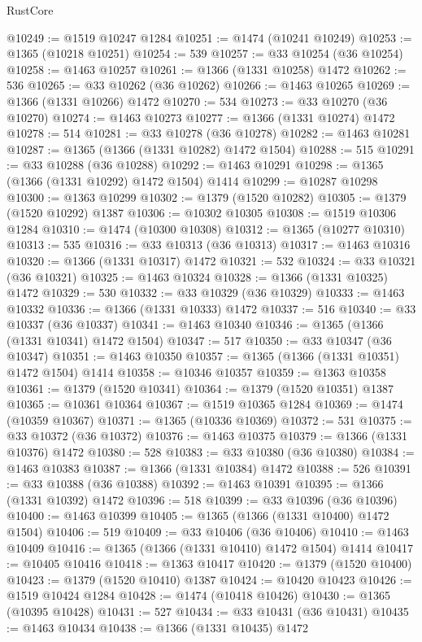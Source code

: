 \begin{lexlean}{RustCore}
\begin{coremodule}
@10249 := @1519 @10247 @1284
@10251 := @1474 (@10241 @10249)
@10253 := @1365 (@10218 @10251)
@10254 := 539
@10257 := @33 @10254 (@36 @10254)
@10258 := @1463 @10257
@10261 := @1366 (@1331 @10258) @1472
@10262 := 536
@10265 := @33 @10262 (@36 @10262)
@10266 := @1463 @10265
@10269 := @1366 (@1331 @10266) @1472
@10270 := 534
@10273 := @33 @10270 (@36 @10270)
@10274 := @1463 @10273
@10277 := @1366 (@1331 @10274) @1472
@10278 := 514
@10281 := @33 @10278 (@36 @10278)
@10282 := @1463 @10281
@10287 := @1365 (@1366 (@1331 @10282) @1472 @1504)
@10288 := 515
@10291 := @33 @10288 (@36 @10288)
@10292 := @1463 @10291
@10298 := @1365 (@1366 (@1331 @10292) @1472 @1504) @1414
@10299 := @10287 @10298
@10300 := @1363 @10299
@10302 := @1379 (@1520 @10282)
@10305 := @1379 (@1520 @10292) @1387
@10306 := @10302 @10305
@10308 := @1519 @10306 @1284
@10310 := @1474 (@10300 @10308)
@10312 := @1365 (@10277 @10310)
@10313 := 535
@10316 := @33 @10313 (@36 @10313)
@10317 := @1463 @10316
@10320 := @1366 (@1331 @10317) @1472
@10321 := 532
@10324 := @33 @10321 (@36 @10321)
@10325 := @1463 @10324
@10328 := @1366 (@1331 @10325) @1472
@10329 := 530
@10332 := @33 @10329 (@36 @10329)
@10333 := @1463 @10332
@10336 := @1366 (@1331 @10333) @1472
@10337 := 516
@10340 := @33 @10337 (@36 @10337)
@10341 := @1463 @10340
@10346 := @1365 (@1366 (@1331 @10341) @1472 @1504)
@10347 := 517
@10350 := @33 @10347 (@36 @10347)
@10351 := @1463 @10350
@10357 := @1365 (@1366 (@1331 @10351) @1472 @1504) @1414
@10358 := @10346 @10357
@10359 := @1363 @10358
@10361 := @1379 (@1520 @10341)
@10364 := @1379 (@1520 @10351) @1387
@10365 := @10361 @10364
@10367 := @1519 @10365 @1284
@10369 := @1474 (@10359 @10367)
@10371 := @1365 (@10336 @10369)
@10372 := 531
@10375 := @33 @10372 (@36 @10372)
@10376 := @1463 @10375
@10379 := @1366 (@1331 @10376) @1472
@10380 := 528
@10383 := @33 @10380 (@36 @10380)
@10384 := @1463 @10383
@10387 := @1366 (@1331 @10384) @1472
@10388 := 526
@10391 := @33 @10388 (@36 @10388)
@10392 := @1463 @10391
@10395 := @1366 (@1331 @10392) @1472
@10396 := 518
@10399 := @33 @10396 (@36 @10396)
@10400 := @1463 @10399
@10405 := @1365 (@1366 (@1331 @10400) @1472 @1504)
@10406 := 519
@10409 := @33 @10406 (@36 @10406)
@10410 := @1463 @10409
@10416 := @1365 (@1366 (@1331 @10410) @1472 @1504) @1414
@10417 := @10405 @10416
@10418 := @1363 @10417
@10420 := @1379 (@1520 @10400)
@10423 := @1379 (@1520 @10410) @1387
@10424 := @10420 @10423
@10426 := @1519 @10424 @1284
@10428 := @1474 (@10418 @10426)
@10430 := @1365 (@10395 @10428)
@10431 := 527
@10434 := @33 @10431 (@36 @10431)
@10435 := @1463 @10434
@10438 := @1366 (@1331 @10435) @1472

\end{coremodule}
\end{lexlean}

